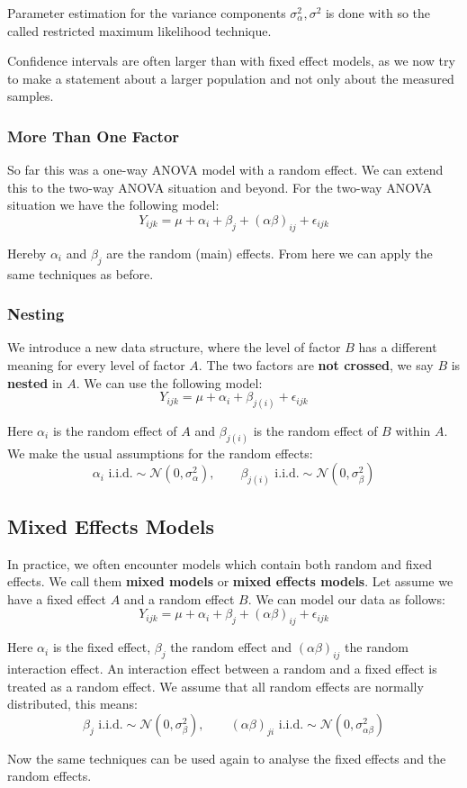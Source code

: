 Parameter estimation for the variance components $\sigma_\alpha^2, \sigma^2$ is done with so the called restricted maximum likelihood technique. \medskip

Confidence intervals are often larger than with fixed effect models, as we now try to make a statement about a larger population and not only about the measured samples.

\subsubsection{More Than One Factor}

So far this was a one-way ANOVA model with a random effect. We can extend this to the two-way ANOVA situation and beyond. For the two-way ANOVA situation we have the following model:
$$Y_{ijk} = \mu + \alpha_i + \beta_j + (\alpha \beta)_{ij} + \epsilon_{ijk}$$

Hereby $\alpha_i$ and $\beta_j$ are the random (main) effects. From here we can apply the same techniques as before.

\subsubsection{Nesting}

We introduce a new data structure, where the level of factor $B$ has a different meaning for every level of factor $A$. The two factors are \textbf{not crossed}, we say $B$ is \textbf{nested} in $A$. We can use the following model:
$$Y_{ijk} = \mu + \alpha_i + \beta_{j(i)} + \epsilon_{ijk}$$

Here $\alpha_i$ is the random effect of $A$ and $\beta_{j(i)}$ is the random effect of $B$ within $A$. We make the usual assumptions for the random effects:
$$\alpha_i \text{ i.i.d.} \sim \mathcal{N}(0, \sigma_\alpha^2), \qquad \beta_{j(i)} \text{ i.i.d.} \sim \mathcal{N}(0, \sigma_\beta^2)$$

\subsection{Mixed Effects Models}

In practice, we often encounter models which contain both random and fixed effects. We call them \textbf{mixed models} or \textbf{mixed effects models}. Let assume we have a fixed effect $A$ and a random effect $B$. We can model our data as follows:
$$Y_{ijk} = \mu + \alpha_i + \beta_j + (\alpha \beta)_{ij} + \epsilon_{ijk}$$

Here $\alpha_i$ is the fixed effect, $\beta_j$ the random effect and $(\alpha \beta)_{ij}$ the random interaction effect. An interaction effect between a random and a fixed effect is treated as a random effect. We assume that all random effects are normally distributed, this means:
$$\beta_j \text{ i.i.d.} \sim \mathcal{N}(0, \sigma_\beta^2), \qquad (\alpha\beta)_{ji} \text{ i.i.d.} \sim \mathcal{N}(0, \sigma_{\alpha\beta}^2)$$

Now the same techniques can be used again to analyse the fixed effects and the random effects.